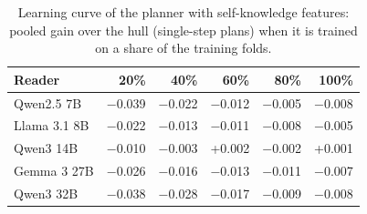 \begin{table}[t]
\centering\footnotesize
\setlength{\tabcolsep}{3pt}
\caption{Learning curve of the planner with self-knowledge features: pooled gain over the hull (single-step plans) when it is trained on a share of the training folds.}
\label{tab:p_curve}
\begin{tabular*}{\linewidth}{@{\extracolsep{\fill}}lrrrrr@{}}
\toprule
Reader & 20\% & 40\% & 60\% & 80\% & 100\% \\
\midrule
Qwen2.5 7B & $-$0.039 & $-$0.022 & $-$0.012 & $-$0.005 & $-$0.008 \\
Llama 3.1 8B & $-$0.022 & $-$0.013 & $-$0.011 & $-$0.008 & $-$0.005 \\
Qwen3 14B & $-$0.010 & $-$0.003 & +0.002 & $-$0.002 & +0.001 \\
Gemma 3 27B & $-$0.026 & $-$0.016 & $-$0.013 & $-$0.011 & $-$0.007 \\
Qwen3 32B & $-$0.038 & $-$0.028 & $-$0.017 & $-$0.009 & $-$0.008 \\
\bottomrule
\end{tabular*}
\end{table}
